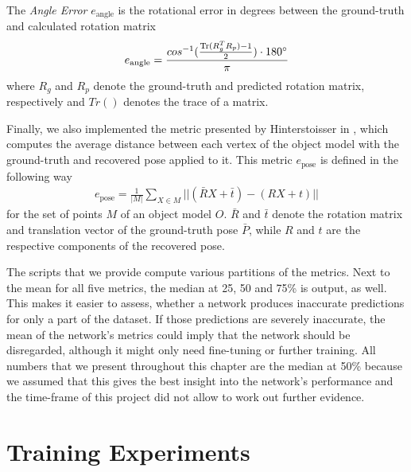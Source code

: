 The \textit{Angle Error} $e_{\text{angle}}$ is the rotational error in degrees between the ground-truth and calculated rotation matrix
\begin{align*}
e_{\text{angle}} = \frac{cos^{-1}(\frac{\operatorname{Tr}(R_g^TR_p) - 1}{2}) \cdot 180\degree}{\pi}
\end{align*}
where $R_g$ and $R_p$ denote the ground-truth and predicted rotation matrix, respectively and $Tr()$ denotes the trace of a matrix.

Finally, we also implemented the metric presented by Hinterstoisser \etal in \cite{hinterstoisser2}, which computes the average distance between each vertex of the object model with the ground-truth and recovered pose applied to it. This metric $e_{\text{pose}}$ is defined in the following way
\begin{align*}
e_{\text{pose}} = \frac{1}{|M|} \sum\limits_{X \in M}||(\bar{R}X + \bar{t}) - (RX + t)||
\end{align*}
for the set of points $M$ of an object model $O$. $\bar{R}$ and $\bar{t}$ denote the rotation matrix and translation vector of the ground-truth pose $\bar{P}$, while $R$ and $t$ are the respective components of the recovered pose.

The scripts that we provide compute various partitions of the metrics. Next to the mean for all five metrics, the median at 25, 50 and 75\% is output, as well. This makes it easier to assess, whether a network produces inaccurate predictions for only a part of the dataset. If those predictions are severely inaccurate, the mean of the network's metrics could imply that the network should be disregarded, although it might only need fine-tuning or further training. All numbers that we present throughout this chapter are the median at 50\% because we assumed that this gives the best insight into the network's performance and the time-frame of this project did not allow to work out further evidence.

\section{Training Experiments}

